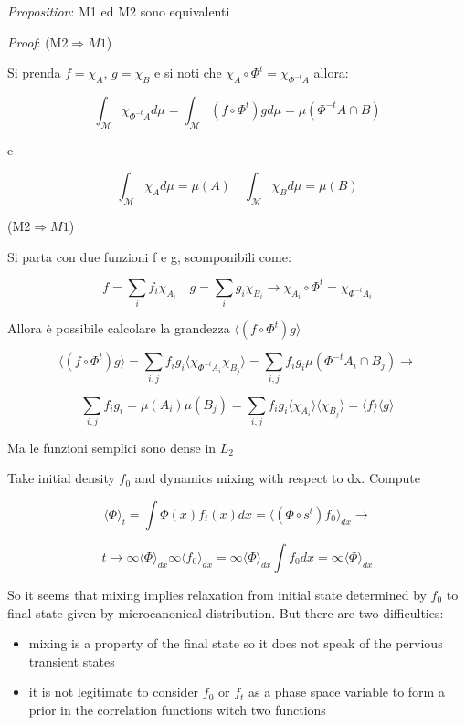 \documentclass{article}
\begin{document}
\textit{Proposition}: M1 ed M2 sono equivalenti \newline

\textit{Proof}: (M2$\Rightarrow M1$)

Si prenda $f=\chi_A$, $g=\chi_B$ e si noti che $\chi_A \circ \Phi^t = \chi_{\Phi^{-t} A}$ allora:

$$ \int_{\mathcal{M}} \chi_{\Phi^{-t} A}  d \mu = \int_{\mathcal M}(f \circ \Phi^t) g d \mu = \mu(\Phi^{-t} A \cap B)$$

e

$$  \int_{\mathcal{M}} \chi_A d \mu = \mu(A) \quad \int_{\mathcal{M}} \chi_B d \mu = \mu(B)$$

(M2$\Rightarrow M1$)

Si parta con due funzioni f e g, scomponibili come:

$$f = \sum_{i} f_i \chi_{A_i} \quad g = \sum_{i} g_i \chi_{B_i} \rightarrow \chi_{A_i} \circ \Phi^t = \chi_{\Phi^{-t} A_i}$$

Allora è possibile calcolare la grandezza $\langle (f \circ \Phi^t) g \rangle$

$$\langle (f \circ \Phi^t) g \rangle = \sum_{i,j} f_i g_i \langle \chi_{\Phi^{-t} A_i} \chi_{B_j} \rangle =  \sum_{i,j} f_i g_i \mu(\Phi^{-t} A_i \cap B_j) \rightarrow $$

$$  \sum_{i,j} f_i g_i =\mu(A_i) \mu(B_j) =  \sum_{i,j} f_i g_i \langle \chi_{A_i} \rangle \langle \chi_{B_j} \rangle = \langle f \rangle \langle g \rangle$$

Ma le funzioni semplici sono dense in $L_2$

Take initial density $f_0$ and dynamics mixing with respect to dx. Compute 

$$\langle \Phi \rangle_t = \int \Phi(x) f_t(x) dx = \langle (\Phi \circ s^t) f_0\rangle_{dx} \rightarrow $$

$$ t \to \infty \langle \Phi \rangle_{dx} \infty \langle f_0 \rangle_{dx} = \infty \langle \Phi \rangle_{dx} \int f_0 dx = \infty \langle \Phi \rangle_{dx} $$

So it seems that mixing implies relaxation from initial state determined by $f_0$ to final state given by microcanonical distribution. But there are two difficulties:

\begin{itemize}
\item mixing is a property of the final state so it does not speak of the pervious transient states
\item it is not legitimate to consider $f_0$ or $f_t$ as a phase space variable to form a prior in the correlation functions witch two functions 
\end{itemize}
\end{document}
